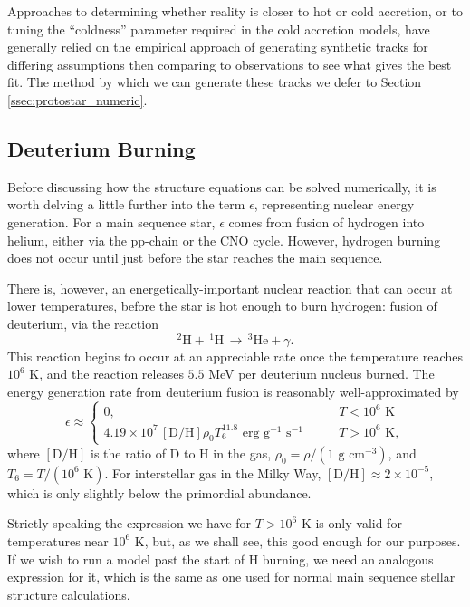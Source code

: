 Approaches to determining whether reality is closer to hot or cold accretion, or to tuning the ``coldness'' parameter required in the cold accretion models, have generally relied on the empirical approach of generating synthetic tracks for differing assumptions then comparing to observations to see what gives the best fit. The method by which we can generate these tracks we defer to Section \ref{ssec:protostar_numeric}.

\subsection{Deuterium Burning}

Before discussing how the structure equations can be solved numerically, it is worth delving a little further into the term $\epsilon$, representing nuclear energy generation. For a main sequence star, $\epsilon$ comes from fusion of hydrogen into helium, either via the pp-chain or the CNO cycle. However, hydrogen burning does not occur until just before the star reaches the main sequence.

There is, however, an energetically-important nuclear reaction that can occur at lower temperatures, before the star is hot enough to burn hydrogen: fusion of deuterium, via the reaction
\begin{equation}
^2\mbox{H} + \,^1\mbox{H}\, \rightarrow \, ^3\mbox{He} + \gamma.
\end{equation}
This reaction begins to occur at an appreciable rate once the temperature reaches $10^6$ K, and the reaction releases $5.5$ MeV per deuterium nucleus burned. The energy generation rate from deuterium fusion is reasonably well-approximated by \citep{kippenhahn94a}
\begin{equation}
\epsilon \approx 
\left\{
\begin{array}{ll}
0, & T < 10^6\mbox{ K} \\
4.19\times 10^7\, [\mbox{D}/\mbox{H}] \rho_0 T_6^{11.8} \mbox{ erg g}^{-1}\mbox{ s}^{-1}
\qquad & T > 10^6\mbox{ K},
\end{array}
\right.
\end{equation}
where $[\mbox{D}/\mbox{H}]$ is the ratio of D to H in the gas, $\rho_0=\rho/(1\mbox{ g cm}^{-3})$, and $T_6=T/(10^6\mbox{ K})$. For interstellar gas in the Milky Way, $[\mbox{D}/\mbox{H}]\approx 2\times 10^{-5}$, which is only slightly below the primordial abundance.

Strictly speaking the expression we have for $T>10^6$ K is only valid for temperatures near $10^6$ K, but, as we shall see, this good enough for our purposes. If we wish to run a model past the start of H burning, we need an analogous expression for it, which is the same as one used for normal main sequence stellar structure calculations.


